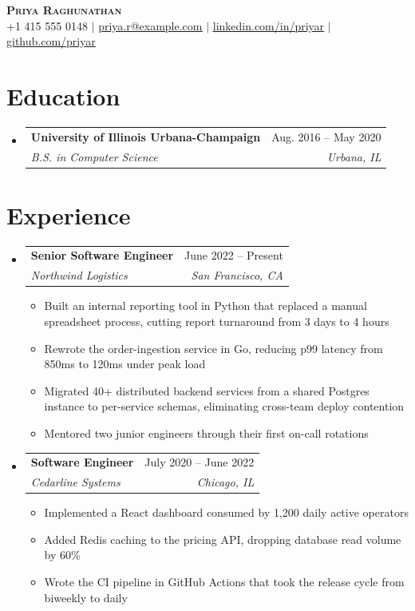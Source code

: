\documentclass[letterpaper,11pt]{article}
\makeatletter
\newcommand{\resumeItem}[1]{
  \item\small{
    {#1 \vspace{-2pt}}
  }
}
\newcommand{\resumeSubheading}[4]{
  \vspace{-2pt}\item
    \begin{tabular*}{0.97\textwidth}[t]{l@{\extracolsep{\fill}}r}
      \textbf{#1} & #2 \\
      \textit{\small#3} & \textit{\small #4} \\
    \end{tabular*}\vspace{-7pt}
}
\newcommand{\resumeSubHeadingListStart}{\begin{itemize}[leftmargin=0.15in, label={}]}
\newcommand{\resumeSubHeadingListEnd}{\end{itemize}}
\newcommand{\resumeItemListStart}{\begin{itemize}}
\newcommand{\resumeItemListEnd}{\end{itemize}\vspace{-5pt}}
\makeatother
\begin{document}
\begin{center}
    \textbf{\Huge \scshape Priya Raghunathan} \\ \vspace{1pt}
    \small +1 415 555 0148 $|$ \href{mailto:priya.r@example.com}{\underline{priya.r@example.com}} $|$
    \href{https://linkedin.com/in/priyar}{\underline{linkedin.com/in/priyar}} $|$
    \href{https://github.com/priyar}{\underline{github.com/priyar}}
\end{center}


\section{Education}
  \resumeSubHeadingListStart
    \resumeSubheading
      {University of Illinois Urbana-Champaign}{Aug. 2016 -- May 2020}
      {B.S. in Computer Science}{Urbana, IL}
  \resumeSubHeadingListEnd


\section{Experience}
  \resumeSubHeadingListStart

    \resumeSubheading
      {Senior Software Engineer}{June 2022 -- Present}
      {Northwind Logistics}{San Francisco, CA}
      \resumeItemListStart
        \resumeItem{Built an internal reporting tool in Python that replaced a manual spreadsheet process, cutting report turnaround from 3 days to 4 hours}
        \resumeItem{Rewrote the order-ingestion service in Go, reducing p99 latency from 850ms to 120ms under peak load}
        \resumeItem{Migrated 40+ distributed backend services from a shared Postgres instance to per-service schemas, eliminating cross-team deploy contention}
        \resumeItem{Mentored two junior engineers through their first on-call rotations}
      \resumeItemListEnd

    \resumeSubheading
      {Software Engineer}{July 2020 -- June 2022}
      {Cedarline Systems}{Chicago, IL}
      \resumeItemListStart
        \resumeItem{Implemented a React dashboard consumed by 1,200 daily active operators}
        \resumeItem{Added Redis caching to the pricing API, dropping database read volume by 60\%}
        \resumeItem{Wrote the CI pipeline in GitHub Actions that took the release cycle from biweekly to daily}
      \resumeItemListEnd

  \resumeSubHeadingListEnd
\end{document}
